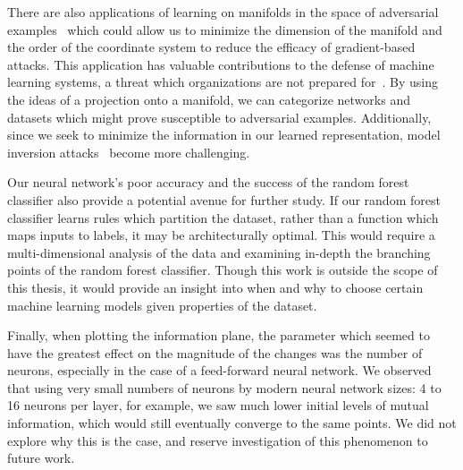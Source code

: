 There are also applications of learning on manifolds in the space of adversarial examples~\cite{szegedy2013intriguing} which could allow us to minimize the dimension of the manifold and the order of the coordinate system to reduce the efficacy of gradient-based attacks.
This application has valuable contributions to the defense of machine learning systems, a threat which organizations are not prepared for~\cite{kumar2020adversarial}.
By using the ideas of a projection onto a manifold, we can categorize networks and datasets which might prove susceptible to adversarial examples.
Additionally, since we seek to minimize the information in our learned representation, model inversion attacks~\cite{zhang2019secret} become more challenging.

Our neural network's poor accuracy and the success of the random forest classifier also provide a potential avenue for further study.
If our random forest classifier learns rules which partition the dataset, rather than a function which maps inputs to labels, it may be architecturally optimal. 
This would require a multi-dimensional analysis of the data and examining in-depth the branching points of the random forest classifier.
Though this work is outside the scope of this thesis, it would provide an insight into when and why to choose certain machine learning models given properties of the dataset.

Finally, when plotting the information plane, the parameter which seemed to have the greatest effect on the magnitude of the changes was the number of neurons, especially in the case of a feed-forward neural network.
We observed that using very small numbers of neurons by modern neural network sizes: 4 to 16 neurons per layer, for example, we saw much lower initial levels of mutual information, which would still eventually converge to the same points. 
We did not explore why this is the case, and reserve investigation of this phenomenon to future work.